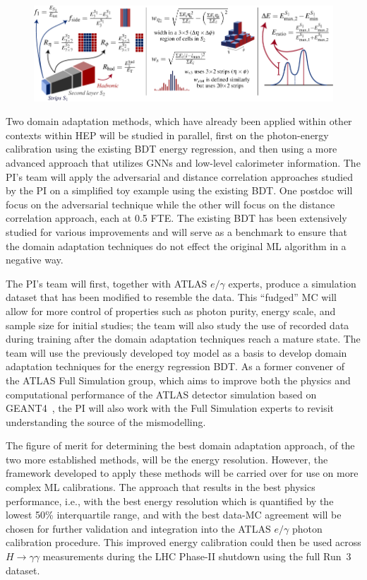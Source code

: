 \documentclass[letter, USenglish, 11pt, subfigure]{article}
\begin{document}
\begin{figure}[ht]
  \centering
  \includegraphics[width=\textwidth]{figures/photon_ID_variables.pdf}
  \caption{\label{fig:showerVars} }
\end{figure}

Two domain adaptation methods, which have already been applied within other contexts within HEP will be studied in parallel, first on the photon-energy calibration using the existing BDT energy regression, and then using a more advanced approach that utilizes GNNs and low-level calorimeter information. The PI's team will apply the adversarial and distance correlation approaches studied by the PI on a simplified toy example using the existing BDT. One postdoc will focus on the adversarial technique while the other will focus on the distance correlation approach, each at 0.5 FTE. The existing BDT has been extensively studied for various improvements and will serve as a benchmark to ensure that the domain adaptation techniques do not effect the original ML algorithm in a negative way.

The PI's team will first, together with ATLAS $e/\gamma$ experts, produce a simulation dataset that has been modified to resemble the data. This ``fudged'' MC will allow for more control of properties such as photon purity, energy scale, and sample size for initial studies; the team will also study the use of recorded data during training after the domain adaptation techniques reach a mature state. The team will use the previously developed toy model as a basis to develop domain adaptation techniques for the energy regression BDT. As a former convener of the ATLAS Full Simulation group, which aims to improve both the physics and computational performance of the ATLAS detector simulation based on GEANT4~\cite{Agostinelli:2002hh}, the PI will also work with the Full Simulation experts to revisit understanding the source of the mismodelling.

The figure of merit for determining the best domain adaptation approach, of the two more established methods, will be the energy resolution. However, the framework developed to apply these methods will be carried over for use on more complex ML calibrations. The approach that results in the best physics performance, i.e., with the best energy resolution which is quantified by the lowest 50\% interquartile range, and with the best data-MC agreement will be chosen for further validation and integration into the ATLAS $e/\gamma$ photon calibration procedure. This improved energy calibration could then be used across $H\to\gamma\gamma$ measurements during the LHC Phase-II shutdown using the full Run~3 dataset.
\end{document}
